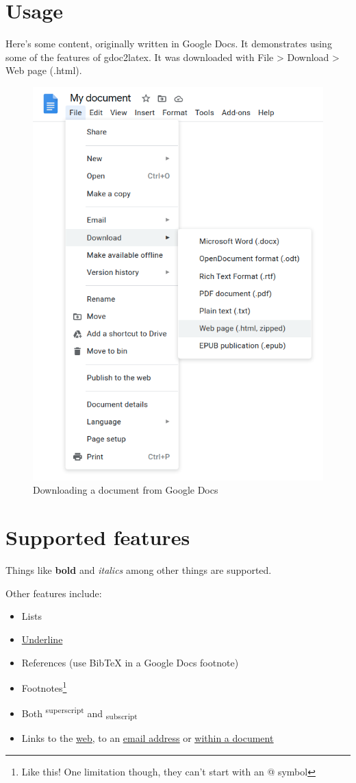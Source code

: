 \documentclass[12pt]{article}
\date{}
\author{}
\begin{document}
\maketitle
\section{Usage}\label{id:h.9brqho78gj4b}

Here’s some content, originally written in Google Docs. It demonstrates using some of the features of gdoc2latex. It was downloaded with File > Download > Web page (.html).

{\centering \begin{figure}[h!]
  \centering
  \includegraphics[width=0.578\linewidth]{images/image1.png}
  \caption{Downloading a document from Google Docs}
\end{figure} \par}

\section{Supported features}\label{id:h.3pfyws1px6lp}

Things like \textbf{bold} and \textit{italics} among other things are supported.

Other features include:

\begin{itemize}
  \item Lists
  \item \underline{Underline}
  \item References (use BibTeX in a Google Docs footnote)\cite{ref1}
  \item Footnotes\footnote{Like this! One limitation though, they can’t start with an @ symbol}
  \item Both \textsuperscript{superscript} and \textsubscript{subscript}
  \item Links to the \underline{\href{https://github.com/domdomegg/gdoc2latex}{web}}, to an \underline{\href{mailto:someone@example.com}{email address}} or \underline{\hyperref[id:h.9brqho78gj4b]{within a document}}
\end{itemize}


\end{document}
